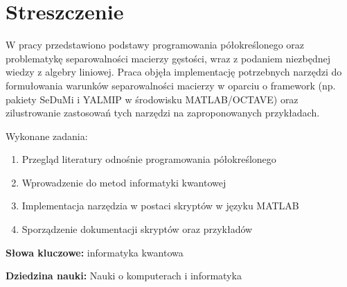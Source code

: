 \section*{Streszczenie}

W pracy przedstawiono podstawy programowania półokreślonego oraz problematykę separowalności macierzy gęstości, wraz z podaniem niezbędnej wiedzy z algebry liniowej. Praca objęła implementację potrzebnych narzędzi do formułowania warunków separowalności macierzy w oparciu o framework (np. pakiety SeDuMi i YALMIP w środowisku MATLAB/OCTAVE) oraz zilustrowanie zastosowań tych narzędzi na zaproponowanych przykładach.

Wykonane zadania:

\begin{enumerate}
    \item Przegląd literatury odnośnie programowania półokreślonego
    \item Wprowadzenie do metod informatyki kwantowej
    \item Implementacja narzędzia w postaci skryptów w języku MATLAB
    \item Sporządzenie dokumentacji skryptów oraz przykładów
\end{enumerate}

\noindent \textbf{Słowa kluczowe:} informatyka kwantowa

\noindent \textbf{Dziedzina nauki:} Nauki o komputerach i informatyka
